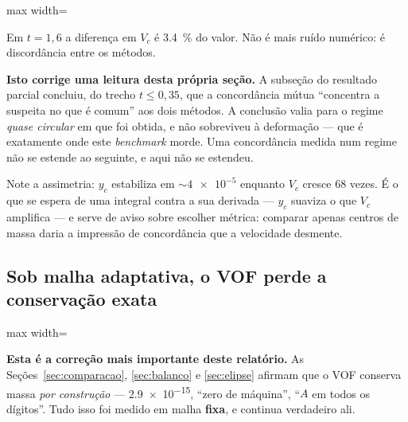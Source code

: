 \begin{adjustbox}{max width=\linewidth}
\end{adjustbox}

Em $t=1{,}6$ a diferen\c{c}a em $V_c$ \'e \SI{3.4}{\percent} do valor. N\~ao \'e
mais ru\'ido num\'erico: \'e discord\^ancia entre os m\'etodos.

\textbf{Isto corrige uma leitura desta pr\'opria se\c{c}\~ao.} A subse\c{c}\~ao do
resultado parcial concluiu, do trecho $t\le0{,}35$, que a concord\^ancia m\'utua
``concentra a suspeita no que \'e comum'' aos dois m\'etodos. A conclus\~ao valia
para o regime \emph{quase circular} em que foi obtida, e n\~ao sobreviveu \`a
deforma\c{c}\~ao --- que \'e exatamente onde este \emph{benchmark} morde. Uma
concord\^ancia medida num regime n\~ao se estende ao seguinte, e aqui n\~ao se
estendeu.

Note a assimetria: $y_c$ estabiliza em $\sim\!\num{4e-5}$ enquanto $V_c$ cresce 68
vezes. \'E o que se espera de uma integral contra a sua derivada --- $y_c$ suaviza
o que $V_c$ amplifica --- e serve de aviso sobre escolher m\'etrica: comparar
apenas centros de massa daria a impress\~ao de concord\^ancia que a velocidade
desmente.

\subsection{Sob malha adaptativa, o VOF perde a conserva\c{c}\~ao exata}
\label{sec:massa-amr}

\begin{adjustbox}{max width=\linewidth}
\end{adjustbox}

\textbf{Esta \'e a corre\c{c}\~ao mais importante deste relat\'orio.} As
Se\c{c}\~oes~\ref{sec:comparacao}, \ref{sec:balanco} e \ref{sec:elipse} afirmam
que o VOF conserva massa \emph{por constru\c{c}\~ao} --- \num{2.9e-15}, ``zero de
m\'aquina'', ``$A$ em todos os d\'igitos''. Tudo isso foi medido em malha
\textbf{fixa}, e continua verdadeiro ali.

